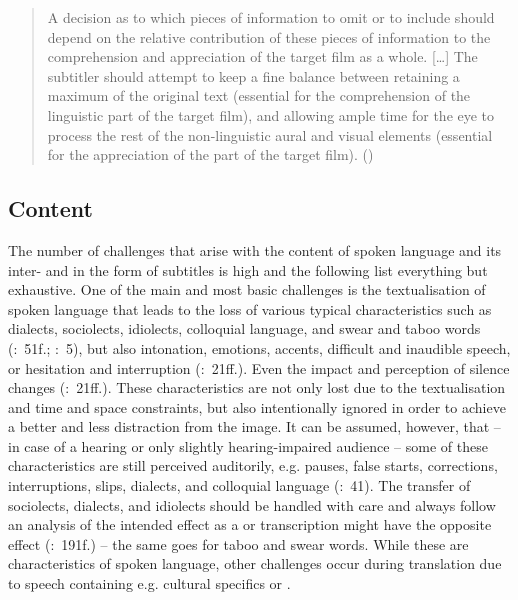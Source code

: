 \begin{quote}
A decision as to which pieces of information to omit or to include should depend on the relative contribution of these pieces of information to the comprehension and appreciation of the target film as a whole. […] The subtitler should attempt to keep a fine balance between retaining a maximum of the original text (essential for the comprehension of the linguistic part of the target film), and allowing ample time for the eye to process the rest of the non-linguistic aural and visual elements (essential for the appreciation of the  part of the target film). (\citealt{Karamitroglou1998})
\end{quote}

\subsection{Content}\label{sec:1.2.2}

The number of challenges that arise with the content of spoken language and its inter- and  in the form of subtitles is high and the following list everything but exhaustive. One of the main and most basic challenges is the textualisation of spoken language that leads to the loss of various typical characteristics such as dialects, sociolects, idiolects, colloquial language, and swear and taboo words (\citealt{Jungst2010}:~51f.; \citealt{Ford_williams2009}:~5), but also intonation, emotions, accents, difficult and inaudible speech, or hesitation and interruption (\citealt{Ford_williams2009}:~21ff.). Even the impact and perception of silence changes (\citealt{Ford_williams2009}:~21ff.). These characteristics are not only lost due to the textualisation and time and space constraints, but also intentionally ignored in order to achieve a better  and less distraction from the image. It can be assumed, however, that – in case of a hearing or only slightly hearing-impaired audience – some of these characteristics are still perceived auditorily, e.g. pauses, false starts, corrections, interruptions, slips, dialects, and colloquial language (\citealt{Leisner2009}:~41). The transfer of sociolects, dialects, and idiolects should be handled with care and always follow an analysis of the intended effect as a  or transcription might have the opposite effect (\citealt{Diaz_cintas2007b}:~191f.) – the same goes for taboo and swear words. While these are characteristics of spoken language, other challenges occur during  translation due to speech containing e.g. cultural specifics or .

